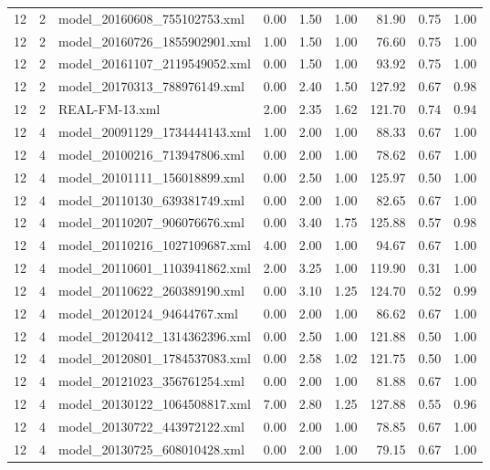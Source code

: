 \begin{table}[ht]
\begin{tabular}{rrlrrrrrr}
   12 &   2 & model\_20160608\_755102753.xml & 0.00 & 1.50 & 1.00 & 81.90 & 0.75 & 1.00 \\ 
   12 &   2 & model\_20160726\_1855902901.xml & 1.00 & 1.50 & 1.00 & 76.60 & 0.75 & 1.00 \\ 
   12 &   2 & model\_20161107\_2119549052.xml & 0.00 & 1.50 & 1.00 & 93.92 & 0.75 & 1.00 \\ 
   12 &   2 & model\_20170313\_788976149.xml & 0.00 & 2.40 & 1.50 & 127.92 & 0.67 & 0.98 \\ 
   12 &   2 & REAL-FM-13.xml & 2.00 & 2.35 & 1.62 & 121.70 & 0.74 & 0.94 \\ 
   12 &   4 & model\_20091129\_1734444143.xml & 1.00 & 2.00 & 1.00 & 88.33 & 0.67 & 1.00 \\ 
   12 &   4 & model\_20100216\_713947806.xml & 0.00 & 2.00 & 1.00 & 78.62 & 0.67 & 1.00 \\ 
   12 &   4 & model\_20101111\_156018899.xml & 0.00 & 2.50 & 1.00 & 125.97 & 0.50 & 1.00 \\ 
   12 &   4 & model\_20110130\_639381749.xml & 0.00 & 2.00 & 1.00 & 82.65 & 0.67 & 1.00 \\ 
   12 &   4 & model\_20110207\_906076676.xml & 0.00 & 3.40 & 1.75 & 125.88 & 0.57 & 0.98 \\ 
   12 &   4 & model\_20110216\_1027109687.xml & 4.00 & 2.00 & 1.00 & 94.67 & 0.67 & 1.00 \\ 
   12 &   4 & model\_20110601\_1103941862.xml & 2.00 & 3.25 & 1.00 & 119.90 & 0.31 & 1.00 \\ 
   12 &   4 & model\_20110622\_260389190.xml & 0.00 & 3.10 & 1.25 & 124.70 & 0.52 & 0.99 \\ 
   12 &   4 & model\_20120124\_94644767.xml & 0.00 & 2.00 & 1.00 & 86.62 & 0.67 & 1.00 \\ 
   12 &   4 & model\_20120412\_1314362396.xml & 0.00 & 2.50 & 1.00 & 121.88 & 0.50 & 1.00 \\ 
   12 &   4 & model\_20120801\_1784537083.xml & 0.00 & 2.58 & 1.02 & 121.75 & 0.50 & 1.00 \\ 
   12 &   4 & model\_20121023\_356761254.xml & 0.00 & 2.00 & 1.00 & 81.88 & 0.67 & 1.00 \\ 
   12 &   4 & model\_20130122\_1064508817.xml & 7.00 & 2.80 & 1.25 & 127.88 & 0.55 & 0.96 \\ 
   12 &   4 & model\_20130722\_443972122.xml & 0.00 & 2.00 & 1.00 & 78.85 & 0.67 & 1.00 \\ 
   12 &   4 & model\_20130725\_608010428.xml & 0.00 & 2.00 & 1.00 & 79.15 & 0.67 & 1.00 \\ 

\end{tabular}
\end{table}
